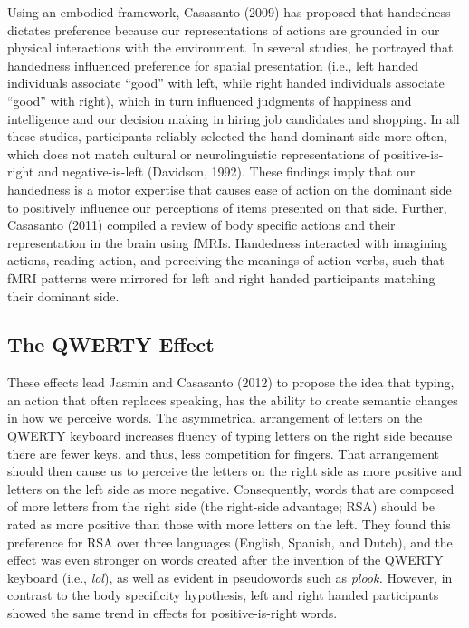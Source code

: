 \documentclass[
  english,
  man,mask]{apa7}
\begin{document}
Using an embodied framework, Casasanto (2009) has proposed that handedness dictates preference because our representations of actions are grounded in our physical interactions with the environment. In several studies, he portrayed that handedness influenced preference for spatial presentation (i.e., left handed individuals associate ``good'' with left, while right handed individuals associate ``good'' with right), which in turn influenced judgments of happiness and intelligence and our decision making in hiring job candidates and shopping. In all these studies, participants reliably selected the hand-dominant side more often, which does not match cultural or neurolinguistic representations of positive-is-right and negative-is-left (Davidson, 1992). These findings imply that our handedness is a motor expertise that causes ease of action on the dominant side to positively influence our perceptions of items presented on that side. Further, Casasanto (2011) compiled a review of body specific actions and their representation in the brain using fMRIs. Handedness interacted with imagining actions, reading action, and perceiving the meanings of action verbs, such that fMRI patterns were mirrored for left and right handed participants matching their dominant side.

\hypertarget{the-qwerty-effect}{%
\subsection{The QWERTY Effect}\label{the-qwerty-effect}}

These effects lead Jasmin and Casasanto (2012) to propose the idea that typing, an action that often replaces speaking, has the ability to create semantic changes in how we perceive words. The asymmetrical arrangement of letters on the QWERTY keyboard increases fluency of typing letters on the right side because there are fewer keys, and thus, less competition for fingers. That arrangement should then cause us to perceive the letters on the right side as more positive and letters on the left side as more negative. Consequently, words that are composed of more letters from the right side (the right-side advantage; RSA) should be rated as more positive than those with more letters on the left. They found this preference for RSA over three languages (English, Spanish, and Dutch), and the effect was even stronger on words created after the invention of the QWERTY keyboard (i.e., \emph{lol}), as well as evident in pseudowords such as \emph{plook.} However, in contrast to the body specificity hypothesis, left and right handed participants showed the same trend in effects for positive-is-right words.
\end{document}
